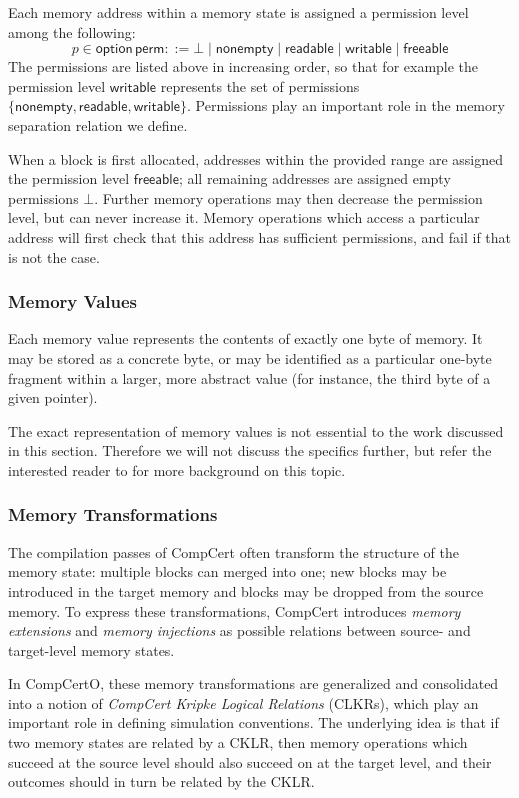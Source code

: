 \documentclass[acmsmall,screen,review,anonymous]{acmart}
\newcommand{\kw}[1]{\ensuremath{ \mathsf{#1} }}
\begin{document}
Each memory address within a memory state
is assigned a permission level among the following:
\[
  p \in \kw{option}\,\kw{perm} ::=
    \bot \mid
    \kw{nonempty} \mid
    \kw{readable} \mid
    \kw{writable} \mid
    \kw{freeable}
\]
The permissions are listed above in increasing order,
so that for example the permission level $\kw{writable}$ 
represents the set of permissions
$\{ \kw{nonempty}, \kw{readable}, \kw{writable} \}$.
Permissions play an important role
in the memory separation relation we define.

When a block is first allocated,
addresses within the provided range
are assigned the permission level $\kw{freeable}$;
all remaining addresses are assigned
empty permissions $\bot$.
Further memory operations may then decrease the permission level,
but can never increase it.
Memory operations which access a particular address
will first check that this address has sufficient permissions,
and fail if that is not the case.

\subsubsection{Memory Values}

Each memory value represents the contents of exactly one byte of memory.
It may be stored as a concrete byte,
or may be identified as a particular one-byte fragment
within a larger, more abstract value
(for instance, the third byte of a given pointer).

The exact representation of memory values
is not essential to the work discussed in this section.
Therefore
we will not discuss the specifics further,
but refer the interested reader to \citet{compcertmmv2}
for more background on this topic.

\subsubsection{Memory Transformations}

The compilation passes of CompCert
often transform the structure of the memory state:
multiple blocks can merged into one;
new blocks may be introduced in the target memory
and blocks may be dropped from the source memory.
To express these transformations,
CompCert introduces \emph{memory extensions} and \emph{memory injections}
as possible relations between source- and target-level memory states.

In CompCertO,
these memory transformations are generalized and consolidated
into a notion of \emph{CompCert Kripke Logical Relations} (CLKRs),
which play an important role in defining simulation conventions.
The underlying idea is that
if two memory states are related by a CKLR,
then memory operations which succeed at the source level
should also succeed on at the target level,
and their outcomes should in turn be related
by the CKLR.
\end{document}
